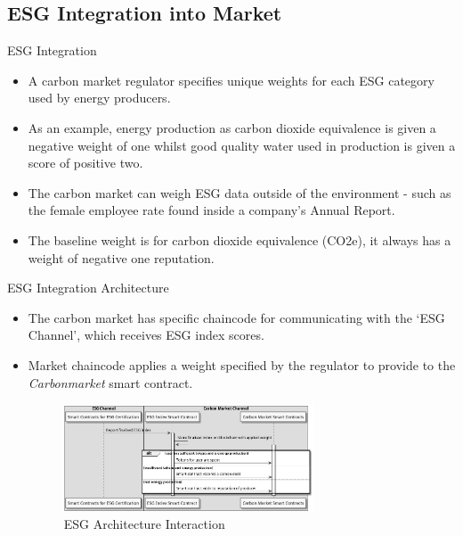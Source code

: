 \subsection{ESG Integration into Market}
\begin{frame}{ESG Integration}
    \begin{itemize}
        \item A carbon market regulator specifies unique weights for
              each ESG category used by energy producers.
        \item As an example, energy production as carbon dioxide
              equivalence is given a negative weight of one whilst good
              quality water used in production is given a score
              of positive two.
        \item The carbon market can weigh ESG data outside of the
              environment - such as the female employee rate found
              inside a company's Annual Report.
        \item The baseline weight is for carbon dioxide equivalence (CO2e), it
              always has a weight of negative one reputation.
    \end{itemize}
\end{frame}
\begin{frame}{ESG Integration Architecture}
    \begin{itemize}
        \item The carbon market has specific chaincode for communicating with
              the `ESG Channel', which receives ESG index scores.
        \item Market chaincode applies a weight specified by the regulator
              to provide to the \textit{Carbonmarket} smart contract.
              \begin{figure}
                  \caption{ESG Architecture Interaction}
                  \centering
                  \includegraphics[height=0.4\textheight, width=0.7\textwidth]
                  {figures/reputation.png}
              \end{figure}
    \end{itemize}
\end{frame}

